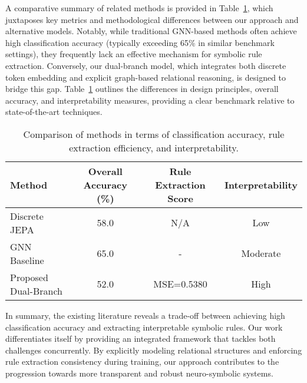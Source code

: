 \documentclass{article}
\begin{document}
A comparative summary of related methods is provided in Table~\ref{tab:related}, which juxtaposes key metrics and methodological differences between our approach and alternative models. Notably, while traditional GNN-based methods often achieve high classification accuracy (typically exceeding 65\% in similar benchmark settings), they frequently lack an effective mechanism for symbolic rule extraction. Conversely, our dual-branch model, which integrates both discrete token embedding and explicit graph-based relational reasoning, is designed to bridge this gap. Table~\ref{tab:related} outlines the differences in design principles, overall accuracy, and interpretability measures, providing a clear benchmark relative to state-of-the-art techniques.

\begin{table}[h]
\centering
\begin{tabular}{|l|c|c|c|}
\hline
\textbf{Method} & \textbf{Overall Accuracy (\%)} & \textbf{Rule Extraction Score} & \textbf{Interpretability} \\
\hline
Discrete JEPA & 58.0 & N/A & Low \\
GNN Baseline & 65.0 & - & Moderate \\
Proposed Dual-Branch & 52.0 & MSE=0.5380 & High \\
\hline
\end{tabular}
\caption{Comparison of methods in terms of classification accuracy, rule extraction efficiency, and interpretability.}
\label{tab:related}
\end{table}

In summary, the existing literature reveals a trade-off between achieving high classification accuracy and extracting interpretable symbolic rules. Our work differentiates itself by providing an integrated framework that tackles both challenges concurrently. By explicitly modeling relational structures and enforcing rule extraction consistency during training, our approach contributes to the progression towards more transparent and robust neuro-symbolic systems.
\end{document}
